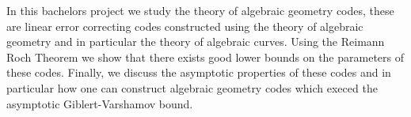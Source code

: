 In this bachelors project we study the theory of algebraic geometry codes, these
are linear error correcting codes constructed using the theory of algebraic geometry and in particular the theory of algebraic curves.
Using the Reimann Roch Theorem we show that there exists good lower bounds on the parameters of these codes.
Finally, we discuss the asymptotic properties of these codes and in particular how one can construct algebraic geometry codes which execed the asymptotic Giblert-Varshamov bound.
